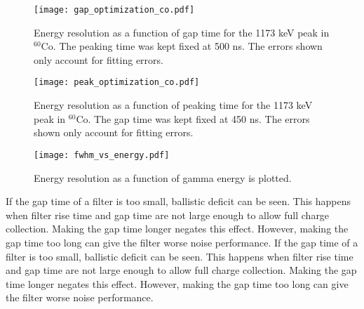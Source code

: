 \begin{figure}[]
\begin{centering}
\texttt{[image: gap\_optimization\_co.pdf]}
\caption{Energy resolution as a function of gap time for the 1173 keV peak in ${}^{60}$Co. The peaking time was kept fixed at 500 ns. The errors shown only account for fitting errors.}
\label{gap}
\end{centering}
\end{figure}
\vspace{5mm}

\begin{figure}[]
\begin{centering}
\texttt{[image: peak\_optimization\_co.pdf]}
\caption{Energy resolution as a function of peaking time for the 1173 keV peak in ${}^{60}$Co. The gap time was kept fixed at 450 ns. The errors shown only account for fitting errors.}
\label{peak}
\end{centering}
\end{figure}
\vspace{5mm}

\begin{figure}[]
\begin{centering}
\texttt{[image: fwhm\_vs\_energy.pdf]}
\caption{Energy resolution as a function of gamma energy is plotted.}
\label{peak}
\end{centering}
\end{figure}
\vspace{5mm}

If the gap time of a filter is too small, ballistic deficit can be seen. This happens when filter rise time and gap time are not large enough to allow full charge collection. Making the gap time longer negates this effect. However, making the gap time too long can give the filter worse noise performance. 
If the gap time of a filter is too small, ballistic deficit can be seen. This happens when filter rise time and gap time are not large enough to allow full charge collection. Making the gap time longer negates this effect. However, making the gap time too long can give the filter worse noise performance. 